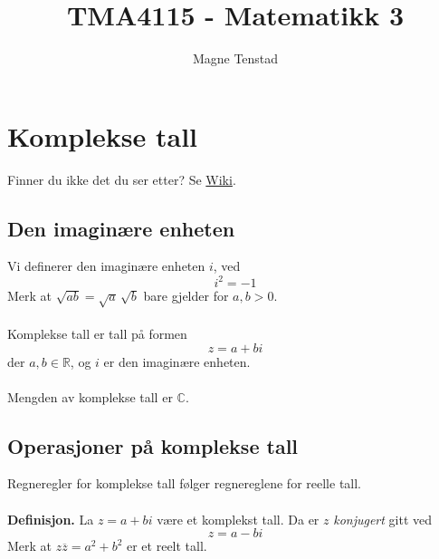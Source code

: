 \documentclass{article}
\title{TMA4115 - Matematikk 3}
\author{Magne Tenstad}
\begin{document}
\maketitle

\clearpage

\tableofcontents




\clearpage
\section{Komplekse tall}
Finner du ikke det du ser etter? Se \href{https://www.math.ntnu.no/emner/TMA4110/2020h/notater/1-komplekse-tall.pdf}{Wiki}.


\subsection{Den imaginære enheten}
Vi definerer den imaginære enheten $i$, ved
\[ i^2 = -1 \]
Merk at $ \sqrt{ab} = \sqrt{a} \, \sqrt{b} $ bare gjelder for $a, b > 0$.
\\\\
Komplekse tall er tall på formen
\[ z = a + bi \]
der $a, b \in \mathbb{R}$, og $i$ er den imaginære enheten.
\\\\
Mengden av komplekse tall er $\mathbb{C}$.


\subsection{Operasjoner på komplekse tall}
Regneregler for komplekse tall følger regnereglene for reelle tall.
\\\\
\textbf{Definisjon.} La $z = a + bi$ være et komplekst tall. Da er $z$ \textit{konjugert} gitt ved
\[ z = a - bi \]
Merk at $z\overline{z} = a^2 + b^2$ er et reelt tall.
\end{document}
